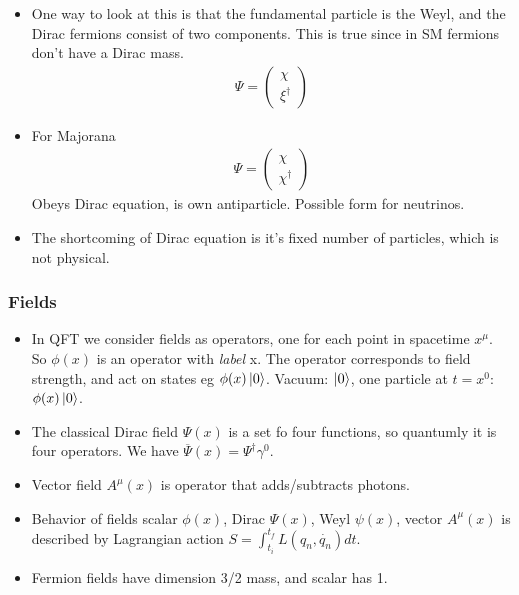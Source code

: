 \begin{itemize}
    \item One way to look at this is that the fundamental particle is the Weyl, and the Dirac fermions consist of two components. This is true since in SM fermions don't have a Dirac mass. \cite{wells}
        \begin{equation}\begin{split}
        \Psi=\begin{pmatrix}\chi\\\xi^\dagger\end{pmatrix}
        \end{split}\end{equation}
    \item For Majorana  \cite{wells}
        \begin{equation}\begin{split}
        \Psi=\begin{pmatrix}\chi\\\chi^\dagger\end{pmatrix}
        \end{split}\end{equation}
        Obeys Dirac equation, is own antiparticle. Possible form for neutrinos.
    \item The shortcoming of Dirac equation is it's fixed number of particles, which is not physical. \cite{wells}
\end{itemize}

\subsubsection{Fields}
\begin{itemize}
    \item In QFT we consider fields as operators, one for each point in spacetime $x^\mu$. So $\phi(x)$ is an operator with \emph{label} x. The operator corresponds to field strength, and act on states eg $\phi(x)\ket{0}$. Vacuum: $\ket{0}$, one particle at $t=x^0$: $\phi(x)\ket{0}$. \cite{wells}
    \item The classical Dirac field $\Psi(x)$ is a set fo four functions, so quantumly it is four operators. We have $\overline{\Psi}(x)=\Psi^\dagger\gamma^0$. \cite{wells}
    \item Vector field $A^\mu(x)$ is operator that adds/subtracts photons. \cite{wells}
    \item Behavior of fields scalar $\phi(x)$, Dirac $\Psi(x)$, Weyl $\psi(x)$, vector $A^\mu(x)$ is described by Lagrangian action $S=\int^{t_f}_{t_i}L(q_n,\dot{q_n})dt$. \cite{wells}
    \item Fermion fields have dimension 3/2 mass, and scalar has 1. \cite{wells}
\end{itemize}

